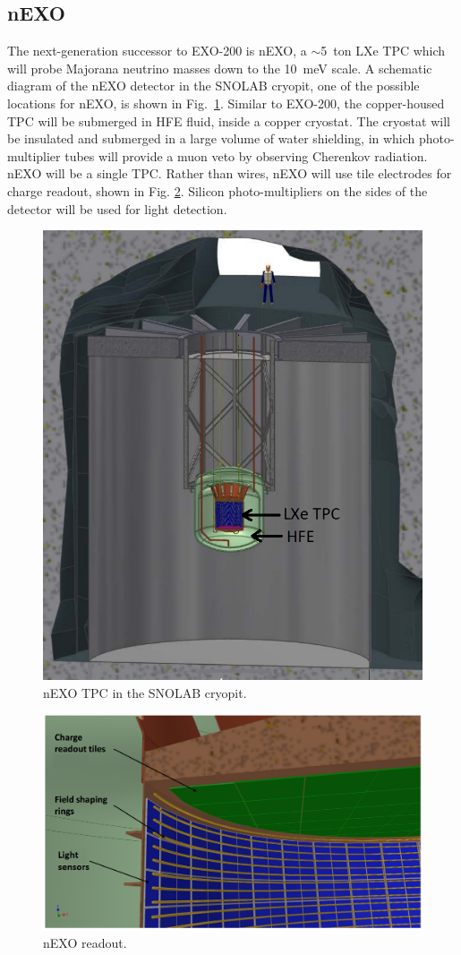 \subsection{nEXO}

The next-generation successor to EXO-200 is nEXO, a $\sim$5~ton LXe TPC which will probe Majorana neutrino masses down to the 10~meV scale.  A schematic diagram of the nEXO detector in the SNOLAB cryopit, one of the possible locations for nEXO, is shown in Fig.~\ref{fig:nEXO_cryopit}.  Similar to EXO-200, the copper-housed TPC will be submerged in HFE fluid, inside a copper cryostat.  The cryostat will be insulated and submerged in a large volume of water shielding, in which photo-multiplier tubes will provide a muon veto by observing Cherenkov radiation.  nEXO will be a single TPC.  Rather than wires, nEXO will use tile electrodes for charge readout, shown in Fig. \ref{fig:nEXO_readout}.  Silicon photo-multipliers on the sides of the detector will be used for light detection.

\begin{figure} %
	\centering
	\includegraphics[width=.7\textwidth]{figures/nEXO_cryopit.png}
	\caption{nEXO TPC in the SNOLAB cryopit.}
\label{fig:nEXO_cryopit}
\end{figure}

\begin{figure} %
	\centering
	\includegraphics[width=.7\textwidth]{figures/nEXO_readout.png}
	\caption{nEXO readout.}
\label{fig:nEXO_readout}
\end{figure}

